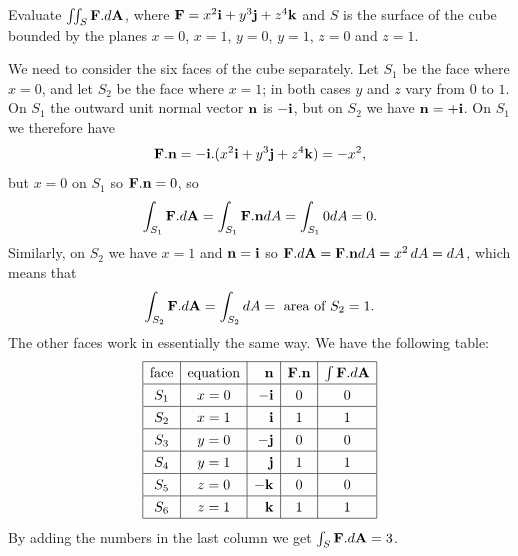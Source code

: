 \documentclass[a4paper]{amsart}
\renewenvironment{solution}{\SolutionInline}{\endSolutionInline}
\begin{document}
\begin{exercise}
 Evaluate $\iint_S\mathbf{F}.d\mathbf{A}$, where $\mathbf{F}=x^2\mathbf{i}+y^3\mathbf{j}+z^4\mathbf{k}$ and $S$
 is the surface of the cube bounded by the planes $x=0$, $x=1$, $y=0$,
 $y=1$, $z=0$ and $z=1$.
\end{exercise}
\begin{solution}
 We need to consider the six faces of the cube separately.  Let $S_1$
 be the face where $x=0$, and let $S_2$ be the face where $x=1$; in
 both cases $y$ and $z$ vary from $0$ to $1$.  On $S_1$ the outward
 unit normal vector $\mathbf{n}$ is $-\mathbf{i}$, but on $S_2$ we have $\mathbf{n}=+\mathbf{i}$.
 On $S_1$ we therefore have
 \[ \mathbf{F}.\mathbf{n}=-\mathbf{i}.(x^2\mathbf{i}+y^3\mathbf{j}+z^4\mathbf{k}) = -x^2, \]
 but $x=0$ on $S_1$ so $\mathbf{F}.\mathbf{n}=0$, so
 \[ \int_{S_1} \mathbf{F}.d\mathbf{A} = \int_{S_1} \mathbf{F}.\mathbf{n} dA = \int_{S_1} 0 dA=0.
 \]
 Similarly, on $S_2$ we have $x=1$ and $\mathbf{n}=\mathbf{i}$ so
 $\mathbf{F}.d\mathbf{A}=\mathbf{F}.\mathbf{n} dA=x^2\,dA=dA$, which means that
 \[ \int_{S_2} \mathbf{F}.d\mathbf{A} = \int_{S_2} dA = 
     \text{ area of } S_2 = 1.
 \]
 The other faces work in essentially the same way.  We have the
 following table:
 \[ \renewcommand{\arraystretch}{1.3}
    \begin{array}{|c|c|r|c|c|} \hline
     \text{face} & \text{equation} & \vn & \vF.\vn & \int \vF.d\vA \\ \hline
     S_1 & x=0 & -\vi & 0 & 0 \\ \hline
     S_2 & x=1 &  \vi & 1 & 1 \\ \hline
     S_3 & y=0 & -\vj & 0 & 0 \\ \hline
     S_4 & y=1 &  \vj & 1 & 1 \\ \hline
     S_5 & z=0 & -\vk & 0 & 0 \\ \hline
     S_6 & z=1 &  \vk & 1 & 1 \\ \hline
    \end{array}
 \]
 By adding the numbers in the last column we get $\int_S\mathbf{F}.d\mathbf{A}=3$. 
\end{solution}
\end{document}
